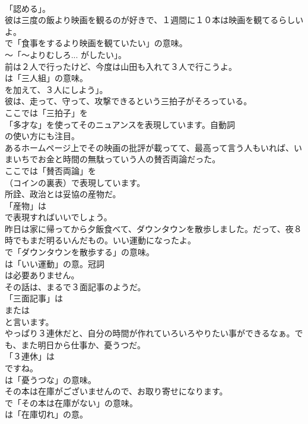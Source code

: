 \documentclass[8pt]{extreport}
\begin{document}
\begin{CJK}{UTF8}{min}
\\	「認める」。	
\\	彼は三度の飯より映画を観るのが好きで、１週間に１０本は映画を観てるらしいよ。 
\\	で「食事をするより映画を観ていたい」の意味。
\\	～「～よりむしろ... がしたい」。	
\\	前は２人で行ったけど、今度は山田も入れて３人で行こうよ。 
\\	は「三人組」の意味。
\\	を加えて、３人にしよう」。	
\\	彼は、走って、守って、攻撃できるという三拍子がそろっている。 
\\	ここでは「三拍子」を
\\	「多才な」を使ってそのニュアンスを表現しています。自動詞
\\	の使い方にも注目。	
\\	あるホームページ上でその映画の批評が載ってて、最高って言う人もいれば、いまいちでお金と時間の無駄っていう人の賛否両論だった。 
\\	ここでは「賛否両論」を 
\\	（コインの裏表）で表現しています。	
\\	所詮、政治とは妥協の産物だ。 
\\	「産物」は 
\\	で表現すればいいでしょう。	
\\	昨日は家に帰ってから夕飯食べて、ダウンタウンを散歩しました。だって、夜８時でもまだ明るいんだもの。いい運動になったよ。 
\\	で「ダウンタウンを散歩する」の意味。
\\	は「いい運動」の意。冠詞 
\\	は必要ありません。	
\\	その話は、まるで３面記事のようだ。 
\\	「三面記事」は
\\	または
\\	と言います。	
\\	やっぱり３連休だと、自分の時間が作れていろいろやりたい事ができるなぁ。でも、また明日から仕事か、憂うつだ。 
\\	「３連休」は
\\	ですね。
\\	は「憂うつな」の意味。	
\\	その本は在庫がございませんので、お取り寄せになります。 
\\	で「その本は在庫がない」の意味。
\\	は「在庫切れ」の意。	

\end{CJK}
\end{document}
